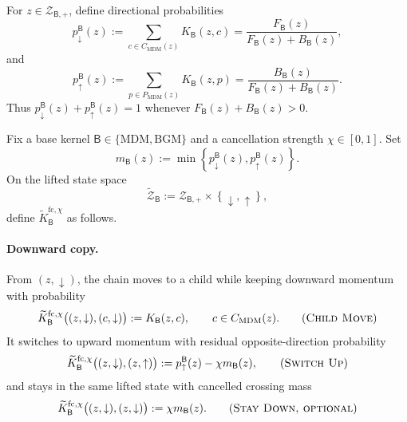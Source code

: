 \documentclass{article}
\numberwithin{theorem}{section}
\numberwithin{proposition}{section}
\numberwithin{corollary}{section}
\numberwithin{lemma}{section}
\numberwithin{conjecture}{section}
\numberwithin{remark}{section}
\numberwithin{definition}{section}
\numberwithin{assumption}{section}
\numberwithin{example}{section}
\newcommand{\calZ}{{\mathcal{Z}}}
\newcommand{\mbra}[1]{\left\{#1\right\}}
\begin{document}
For \(z\in\calZ_{\mathsf B,+}\), define directional probabilities
\begin{equation*}
    p_{\downarrow}^{\mathsf B}(z):=\sum_{c\in C_{\mathrm{MDM}}(z)}K_{\mathsf B}(z,c)=\frac{F_{\mathsf B}(z)}{F_{\mathsf B}(z)+B_{\mathsf B}(z)},
\end{equation*}
and
\begin{equation*}
    p_{\uparrow}^{\mathsf B}(z):=\sum_{p\in P_{\mathrm{MDM}}(z)}K_{\mathsf B}(z,p)=\frac{B_{\mathsf B}(z)}{F_{\mathsf B}(z)+B_{\mathsf B}(z)}.
\end{equation*}
Thus $p_{\downarrow}^{\mathsf B}(z)+p_{\uparrow}^{\mathsf B}(z)=1$ whenever $F_{\mathsf B}(z)+B_{\mathsf B}(z)>0$.

\begin{definition}
\label{def:generic_mdm_flow_cancelled_kernel}
\label{def:balanced_mdm_flow_cancelled_kernel}
Fix a base kernel $\mathsf B\in\{\mathrm{MDM},\mathrm{BGM}\}$ and a cancellation strength $\chi\in[0,1]$. Set
\begin{equation*}
    m_{\mathsf B}(z):=\min\mbra{p_{\downarrow}^{\mathsf B}(z),p_{\uparrow}^{\mathsf B}(z)}.
\end{equation*}
On the lifted state space
\begin{equation*}
    \widetilde{\calZ}_{\mathsf B}:=\calZ_{\mathsf B,+}\times\mbra{\downarrow,\uparrow},
\end{equation*}
define $\widetilde K_{\mathsf B}^{\mathrm{fc},\chi}$ as follows.

\paragraph{Downward copy.}
From $(z,\downarrow)$, the chain moves to a child while keeping downward momentum with probability
\begin{equation*}
    \widetilde K_{\mathsf B}^{\mathrm{fc},\chi}\bigl((z,\downarrow),(c,\downarrow)\bigr):=K_{\mathsf B}(z,c),\qquad c\in C_{\mathrm{MDM}}(z).
    \tag{\textsc{Child Move}}
\end{equation*}
It switches to upward momentum with residual opposite-direction probability
\begin{equation*}
    \widetilde K_{\mathsf B}^{\mathrm{fc},\chi}\bigl((z,\downarrow),(z,\uparrow)\bigr):=p_{\uparrow}^{\mathsf B}(z)-\chi m_{\mathsf B}(z),
    \tag{\textsc{Switch Up}}
\end{equation*}
and stays in the same lifted state with cancelled crossing mass
\begin{equation*}
    \widetilde K_{\mathsf B}^{\mathrm{fc},\chi}\bigl((z,\downarrow),(z,\downarrow)\bigr):=\chi m_{\mathsf B}(z).
    \tag{\textsc{Stay Down, optional}}
\end{equation*}


\end{definition}
\end{document}
